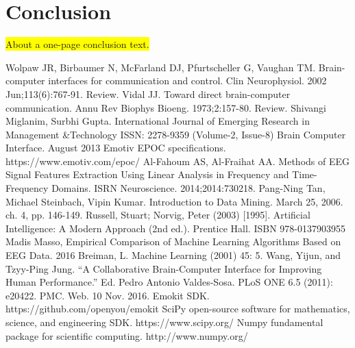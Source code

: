\documentclass[12pt]{article}
\begin{document}
\newpage
\section{Conclusion}
\colorbox{yellow}{About a one-page conclusion text.}

\newpage
\begin{thebibliography}{9}

Wolpaw JR, Birbaumer N, McFarland DJ, Pfurtscheller G, Vaughan TM.
Brain-computer interfaces for communication and control. Clin Neurophysiol. 2002 
Jun;113(6):767-91. Review.
Vidal JJ. Toward direct brain-computer communication. Annu Rev Biophys Bioeng.
1973;2:157-80. Review.
Shivangi Miglanim, Surbhi Gupta.  International Journal of Emerging Research in Management \&Technology
ISSN: 2278-9359 (Volume-2, Issue-8)
Brain Computer Interface. 
August 2013
Emotiv EPOC specifications. https://www.emotiv.com/epoc/
Al-Fahoum AS, Al-Fraihat AA. Methods of EEG Signal Features Extraction Using Linear Analysis in Frequency and Time-Frequency Domains. ISRN Neuroscience. 2014;2014:730218.
Pang-Ning Tan, Michael Steinbach, Vipin Kumar. Introduction to Data Mining. March 25, 2006. ch. 4, pp. 146-149.
Russell, Stuart; Norvig, Peter (2003) [1995]. Artificial Intelligence: A Modern Approach (2nd ed.). Prentice Hall. ISBN 978-0137903955
Madis Masso, Empirical Comparison of Machine Learning Algorithms Based on EEG Data. 2016
Breiman, L. Machine Learning (2001) 45: 5. 
Wang, Yijun, and Tzyy-Ping Jung. ``A Collaborative Brain-Computer Interface for Improving Human Performance.'' Ed. Pedro Antonio Valdes-Sosa. PLoS ONE 6.5 (2011): e20422. PMC. Web. 10 Nov. 2016.
Emokit SDK. https://github.com/openyou/emokit
SciPy open-source software for mathematics, science, and engineering SDK. https://www.scipy.org/
Numpy fundamental package for scientific computing. http://www.numpy.org/
\end{thebibliography}

%

\appendix
\end{document}
